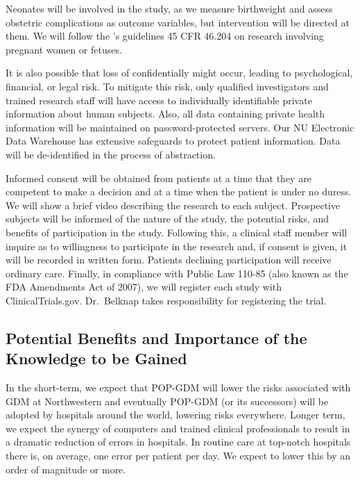 Neonates will be involved in the study, as we measure birthweight and
assess obstetric complications as outcome variables, but intervention
will be directed at them.
We will follow the \citet{45cfr46}'s guidelines 45 CFR 46.204
on research involving pregnant women or fetuses.

It is also possible that loss of confidentially might occur, leading
to psychological, financial, or legal risk.  To mitigate this risk,
only qualified investigators and trained research staff will have
access to individually identifiable private information about human
subjects.  Also, all data containing private health information will
be maintained on password-protected servers. Our NU Electronic Data
Warehouse has extensive safeguards to protect patient
information. Data will be de-identified in the process of abstraction.

Informed consent will be obtained from patients at a time that they
are competent to make a decision and at a time when the patient is
under no duress. We will show a brief video describing the research to
each subject. Prospective subjects will be informed of the nature of
the study, the potential risks, and benefits of participation in the
study.  Following this, a clinical staff member will inquire as to willingness to participate
in the research and, if consent is given, it will be recorded in
written form. Patients declining participation will receive ordinary
care.
Finally, in compliance with Public Law 110-85 (also known as the FDA
Amendments Act of 2007), we will register each study with
ClinicalTrials.gov. Dr.\ Belknap takes responsibility for registering
the trial.

\subsection{Potential Benefits and Importance of the Knowledge to be Gained}

In the short-term, we expect that POP-GDM will lower the risks
associated with GDM at Northwestern and eventually POP-GDM (or its
successors) will be adopted by hospitals around the world, lowering
risks everywhere. Longer term, we expect the synergy of computers and
trained clinical professionals to result in a dramatic reduction of
errors in hospitals. In routine care at top-notch hospitals there is,
on average, one error per patient per day. We expect to lower this by
an order of magnitude or more.
